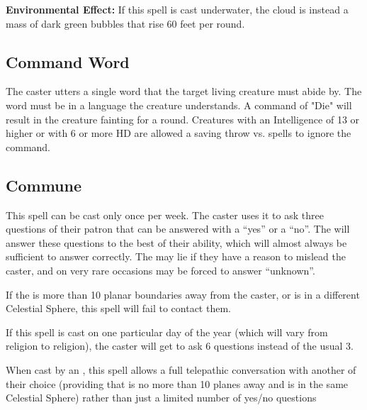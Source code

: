\begin{multicols*}{2}
\textbf{Environmental Effect:} If this spell is cast underwater, the cloud is instead a mass of dark green bubbles that rise 60 feet per round.

\subsection{Command Word}\label{spell:Command Word}

The caster utters a single word that the target living creature must abide by. The word must be in a language the creature understands. A command of "Die" will result in the creature fainting for a round. Creatures with an Intelligence of 13 or higher or with 6 or more HD are allowed a saving throw vs. spells to ignore the command.

\subsection{Commune}\label{spell:Commune}

This spell can be cast only once per week. The caster uses it to ask three questions of their patron  that can be answered with a “yes” or a “no”. The  will answer these questions to the best of their ability, which will almost always be sufficient to answer correctly. The  may lie if they have a reason to mislead the caster, and on very rare occasions may be forced to answer “unknown”.

If the  is more than 10 planar boundaries away from the caster, or is in a different Celestial Sphere, this spell will fail to contact them.

If this spell is cast on one particular day of the year (which will vary from religion to religion), the caster will get to ask 6 questions instead of the usual 3.

When cast by an , this spell allows a full telepathic conversation with another  of their choice (providing that  is no more than 10 planes away and is in the same Celestial Sphere) rather than just a limited number of yes/no questions


\end{multicols*}
